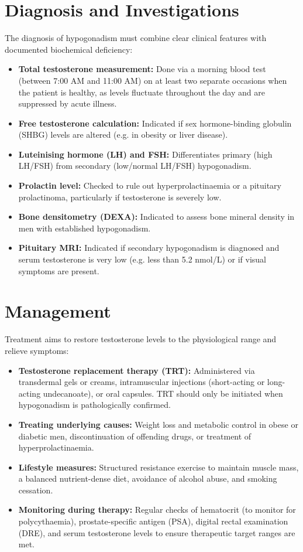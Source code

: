 \section*{Diagnosis and Investigations}
The diagnosis of hypogonadism must combine clear clinical features with documented biochemical deficiency:
\begin{itemize}
    \item \textbf{Total testosterone measurement:} Done via a morning blood test (between 7:00 AM and 11:00 AM) on at least two separate occasions when the patient is healthy, as levels fluctuate throughout the day and are suppressed by acute illness.
    \item \textbf{Free testosterone calculation:} Indicated if sex hormone-binding globulin (SHBG) levels are altered (e.g. in obesity or liver disease).
    \item \textbf{Luteinising hormone (LH) and FSH:} Differentiates primary (high LH/FSH) from secondary (low/normal LH/FSH) hypogonadism.
    \item \textbf{Prolactin level:} Checked to rule out hyperprolactinaemia or a pituitary prolactinoma, particularly if testosterone is severely low.
    \item \textbf{Bone densitometry (DEXA):} Indicated to assess bone mineral density in men with established hypogonadism.
    \item \textbf{Pituitary MRI:} Indicated if secondary hypogonadism is diagnosed and serum testosterone is very low (e.g. less than 5.2 nmol/L) or if visual symptoms are present.
\end{itemize}

\section*{Management}
Treatment aims to restore testosterone levels to the physiological range and relieve symptoms:
\begin{itemize}
    \item \textbf{Testosterone replacement therapy (TRT):} Administered via transdermal gels or creams, intramuscular injections (short-acting or long-acting undecanoate), or oral capsules. TRT should only be initiated when hypogonadism is pathologically confirmed.
    \item \textbf{Treating underlying causes:} Weight loss and metabolic control in obese or diabetic men, discontinuation of offending drugs, or treatment of hyperprolactinaemia.
    \item \textbf{Lifestyle measures:} Structured resistance exercise to maintain muscle mass, a balanced nutrient-dense diet, avoidance of alcohol abuse, and smoking cessation.
    \item \textbf{Monitoring during therapy:} Regular checks of hematocrit (to monitor for polycythaemia), prostate-specific antigen (PSA), digital rectal examination (DRE), and serum testosterone levels to ensure therapeutic target ranges are met.
\end{itemize}

